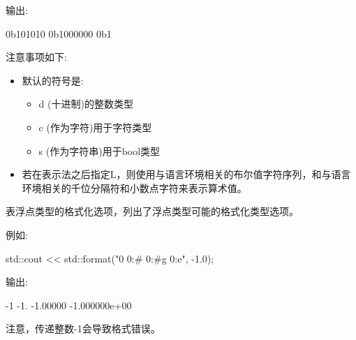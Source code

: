输出:

\begin{shell}
0b101010 0b1000000 0b1
\end{shell}

注意事项如下:

\begin{itemize}
\item
默认的符号是:

\begin{itemize}
\item
d (十进制)的整数类型

\item
c (作为字符)用于字符类型

\item
s (作为字符串)用于bool类型
\end{itemize}

\item
若在表示法之后指定L，则使用与语言环境相关的布尔值字符序列，和与语言环境相关的千位分隔符和小数点字符来表示算术值。
\end{itemize}


表浮点类型的格式化选项，列出了浮点类型可能的格式化类型选项。

例如:

\begin{cpp}
std::cout << std::format("{0} {0:#} {0:#g} {0:e}\n", -1.0);
\end{cpp}

输出:

\begin{shell}
-1 -1. -1.00000 -1.000000e+00
\end{shell}

注意，传递整数-1会导致格式错误。

